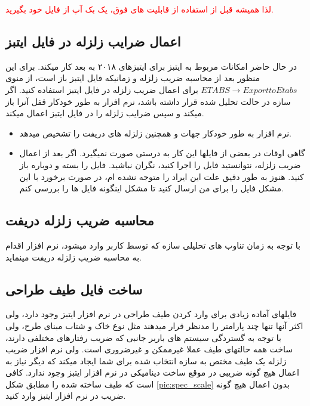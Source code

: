 \textcolor{red}{لذا همیشه قبل از استفاده از قابلیت های فوق، یک بک آپ از فایل خود بگیرید.}

\subsection{اعمال ضرایب زلزله در فایل ایتبز}
در حال حاضر امکانات مربوط به ایتبز برای ایتبزهای ۲۰۱۸ به بعد کار میکند. برای این منظور بعد از محاسبه ضریب زلزله و زمانیکه فایل ایتبز باز است، از منوی
$ETABS \rightarrow Export to Etabs$
برای اعمال ضریب زلزله در فایل ایتبز استفاده کنید. اگر سازه در حالت تحلیل شده قرار داشته باشد، نرم افزار به طور خودکار قفل آنرا باز میکند و سپس ضرایب زلزله را در فایل ایتبز اعمال میکند.

\begin{itemize}
    \item نرم افزار به طور خودکار جهات  و همچنین زلزله های دریفت را تشخیص میدهد.
    \item گاهی اوقات در بعضی از فایلها این کار به درستی صورت نمیگیرد. اگر بعد از اعمال ضریب زلزله، نتوانستید فایل را اجرا کنید، نگران نباشید. فایل را بسته و دوباره باز کنید. هنوز به طور دقیق علت این ایراد را متوجه نشده ام، در صورت برخورد با این مشکل فایل را برای من ارسال کنید تا مشکل اینگونه فایل ها را بررسی کنم.
\end{itemize}

\subsection{محاسبه ضریب زلزله دریفت}
با توجه به زمان تناوب های تحلیلی سازه که توسط کاربر وارد میشود، نرم افزار اقدام به محاسبه ضریب زلزله دریفت مینماید. 

\subsection{ساخت فایل طیف طراحی}
فایلهای آماده زیادی برای وارد کردن طیف طراحی در نرم افزار ایتبز وجود دارد، ولی اکثر آنها تنها چند پارامتر را مدنظر قرار میدهند مثل نوع خاک و شتاب مبنای طرح، ولی با توجه به گستردگی سیستم های باربر جانبی که ضریب رفتارهای مختلفی دارند،
ساخت همه حالتهای طیف عملا غیرممکن و غیرضروری است. ولی نرم افزار ضریب زلزله یک طیف مختص به سازه انتخاب شده برای شما ایجاد میکند که دیگر نیاز به اعمال هیچ گونه ضریبی در موقع ساخت
دینامیکی  در نرم افزار ایتبز وجود ندارد.
کافی است که طیف ساخته شده را مطابق شکل 
\ref{pic:spec_scale}
بدون اعمال هیچ گونه ضریب در نرم افزار ایتبز وارد کنید.

